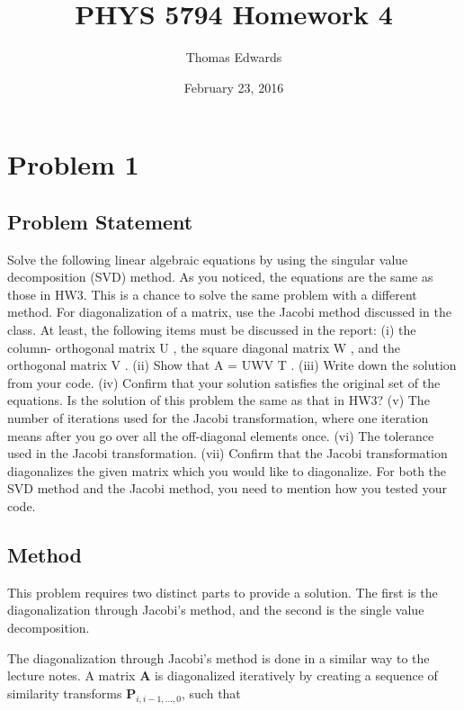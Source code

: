 \documentclass[10pt,letter]{article}
\begin{document}
\begin{titlepage}
\title{PHYS 5794 Homework 4}
\date{February 23, 2016}
\author{Thomas Edwards}
\maketitle
\end{titlepage}

\section{Problem 1}

\subsection{Problem Statement}
Solve the following linear algebraic equations by using the singular value decomposition (SVD)
method. As you noticed, the equations are the same as those in HW3. This is a chance to solve
the same problem with a different method. For diagonalization of a matrix, use the Jacobi method
discussed in the class. At least, the following items must be discussed in the report: (i) the column-
orthogonal matrix U , the square diagonal matrix W , and the orthogonal matrix V . (ii) Show that
A = UWV T . (iii) Write down the solution from your code. (iv) Confirm that your solution satisfies
the original set of the equations. Is the solution of this problem the same as that in HW3? (v)
The number of iterations used for the Jacobi transformation, where one iteration means after you
go over all the off-diagonal elements once. (vi) The tolerance used in the Jacobi transformation.
(vii) Confirm that the Jacobi transformation diagonalizes the given matrix which you would like to
diagonalize. For both the SVD method and the Jacobi method, you need to mention how you tested
your code.

\subsection{Method}

This problem requires two distinct parts to provide a solution. The first is the diagonalization through Jacobi's method, and the second is the single value decomposition.

The diagonalization through Jacobi's method is done in a similar way to the lecture notes. A matrix \textbf{A} is diagonalized iteratively by creating a sequence of similarity transforms $\textbf{P}_{i,i-1, ..., 0}$, such that
\end{document}
